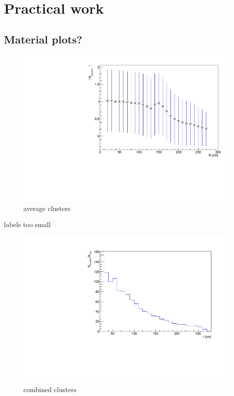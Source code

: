 \chapter{Practical work}\label{cha:work} %


\section{Material plots?}
\begin{figure}[H]
    \centering
    \includegraphics[width=.6\linewidth]{img/averageClusters.pdf}
    \caption{average clusters}
    \label{fig:work:average}
\end{figure}
labels too small
\begin{figure}[H]
    \centering
    \includegraphics[width=.6\linewidth]{img/combined_clusters_norot.pdf}
    \caption{combined clusters}
    \label{fig:work:combined}
\end{figure}


